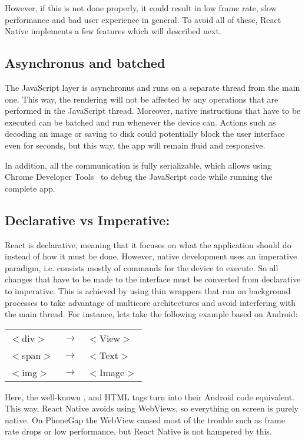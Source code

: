 However, if this is not done properly, it could result in low frame rate, slow performance and bad user experience in general. To avoid all of these, React Native implements a few features which will described next.

\subsection{Asynchronus and batched} 

The JavaScript layer is asynchronus and runs on a separate thread from the main one. This way, the rendering will not be affected by any operations that are performed in the JavaScript thread. Moreover, native instructions that have to be executed can be batched and run whenever the device can. Actions such as decoding an image or saving to disk could potentially block the user interface even for seconds, but this way, the app will remain fluid and responsive.

In addition, all the communication is fully serializable, which allows using Chrome Developer Tools~\cite{chromedevtools} to debug the JavaScript code while running the complete app.

\subsection{Declarative vs Imperative:} 

React is declarative, meaning that it focuses on what the application should do instead of how it must be done. However, native development uses an imperative paradigm, i.e. consists mostly of commands for the device to execute. So all changes that have to be made to the interface must be converted from declarative to imperative. This is achieved by using thin wrappers that run on background processes to take advantage of multicore architectures and avoid interfering with the main thread. For instance, lets take the following example based on Android:

\begin{table}[H]
\centering
\label{declarative-imperative-example}
\begin{tabular}{lll}
$<$div$>$ & $\rightarrow$ & $<$View$>$  \\
$<$span$>$ & $\rightarrow$ &   $<$Text$>$\\
$<$img$>$  & $\rightarrow$ & $<$Image$>$
\end{tabular}
\end{table}

Here, the well-known ,  and  HTML tags turn into their Android code equivalent. This way, React Native avoids using WebViews, so everything on screen is purely native. On PhoneGap the WebView caused most of the trouble such as frame rate drops or low performance, but React Native is not hampered by this.

